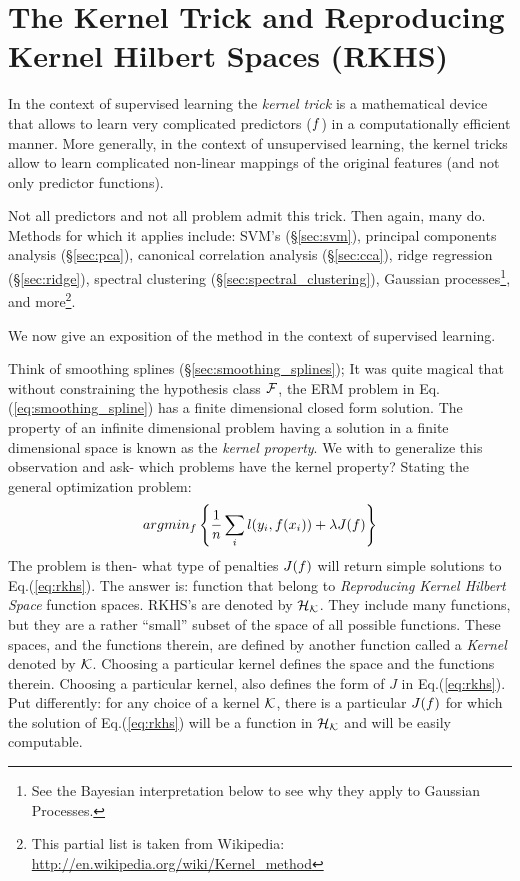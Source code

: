 

\chapter{The Kernel Trick and Reproducing Kernel Hilbert Spaces (RKHS)}
\label{apx:rkhs}

In the context of supervised learning the \emph{kernel trick} is a mathematical device that allows to learn very complicated predictors ($f$) in a computationally efficient manner. 
More generally, in the context of unsupervised learning, the kernel tricks allow to learn complicated non-linear mappings of the original features (and not only predictor functions). 

Not all predictors and not all problem admit this trick. Then again, many do. 
Methods for which it applies include:
SVM's (\S\ref{sec:svm}), principal components analysis (\S\ref{sec:pca}), canonical correlation analysis (\S\ref{sec:cca}), ridge regression (\S\ref{sec:ridge}), spectral clustering (\S\ref{sec:spectral_clustering}), Gaussian processes\footnote{See the Bayesian interpretation below to see why they apply to Gaussian Processes.}, and more\footnote{This partial list is taken from Wikipedia: \url{http://en.wikipedia.org/wiki/Kernel_method}}.

We now give an exposition of the method in the context of supervised learning. 


Think of smoothing splines (\S\ref{sec:smoothing_splines});
It was quite magical that without constraining the hypothesis class $\mathcal{F}$, the ERM problem in Eq.(\ref{eq:smoothing_spline}) has a finite dimensional closed form solution.
The property of an infinite dimensional problem having a solution in a finite dimensional space is known as the \emph{kernel property}.
We with to generalize this observation and ask- which problems have the kernel property?
Stating the general optimization problem:
\begin{align}
\label{eq:rkhs}
	argmin_{f}\left\{ \frac{1}{n} \sum_i l(y_i,f(x_i)) + \lambda J(f)  \right\}
\end{align}
The problem is then- what type of penalties $J(f)$ will return simple solutions to Eq.(\ref{eq:rkhs}).
The answer is: function that belong to \emph{Reproducing Kernel Hilbert Space} function spaces. 
RKHS's are denoted by $\mathcal{H}_{\mathcal{K}}$.
They include many functions, but they are a rather ``small'' subset of the space of all possible functions.
These spaces, and the functions therein, are defined by another function called a \emph{Kernel} denoted by $\mathcal{K}$. 
Choosing a particular kernel defines the space and the functions therein.
Choosing a particular kernel, also defines the form of $J$ in Eq.(\ref{eq:rkhs}).
Put differently: for any choice of a kernel $\mathcal{K}$, there is a particular $J(f)$ for which the solution of Eq.(\ref{eq:rkhs}) will be a function in $\mathcal{H}_{\mathcal{K}}$ and will be easily computable. 


